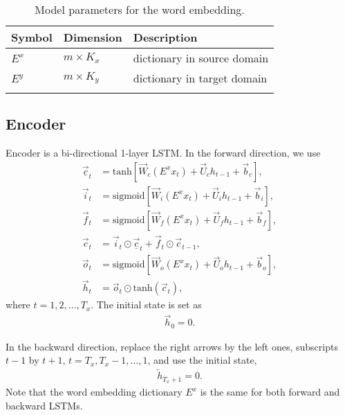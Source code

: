 \documentclass{article}
\begin{document}
\begin{table}[!htb]
\centering
\begin{tabular}{lll}
\toprule
Symbol & Dimension & Description \\
\midrule
$E^x$ & $m \times K_x$ & dictionary in source domain \\
$E^y$ & $m \times K_y$ & dictionary in target domain \\
\bottomrule \\
\end{tabular}
\caption{Model parameters for the word embedding.}
\label{tab:IOModel}
\end{table}




\subsection{Encoder}

	Encoder is a bi-directional 1-layer LSTM. In the forward direction, we use
		\begin{align}
			\overrightarrow{\underline{c}}_t &= \textrm{tanh}\left[ \overrightarrow{W}_c (E^x x_t) + \overrightarrow{U}_c h_{t-1} + \overrightarrow{b}_c \right], \\
			\overrightarrow{i}_t &= \textrm{sigmoid}\left[ \overrightarrow{W}_i (E^x x_t) + \overrightarrow{U}_i h_{t-1} + \overrightarrow{b}_i \right], \\
			\overrightarrow{f}_t &= \textrm{sigmoid}\left[ \overrightarrow{W}_f (E^x x_t) + \overrightarrow{U}_f h_{t-1} + \overrightarrow{b}_f \right], \\
			\overrightarrow{c}_t &= \overrightarrow{i}_t \odot \overrightarrow{\underline{c}}_t + \overrightarrow{f}_t \odot \overrightarrow{c}_{t-1}, \\
			\overrightarrow{o}_t &= \textrm{sigmoid}\left[ \overrightarrow{W}_o (E^x x_t) + \overrightarrow{U}_o h_{t-1} + \overrightarrow{b}_o \right], \\
			\overrightarrow{h}_t &= \overrightarrow{o}_t \odot \textrm{tanh}(\overrightarrow{c}_t),
		\end{align}
		where $t = 1, 2, \dots, T_x$. The initial state is set as
		\begin{align}
			\overrightarrow{h}_0 = 0.
		\end{align}
	
	In the backward direction, replace the right arrows by the left ones, subscripts $t - 1$ by $t + 1$, $t = T_x, T_x - 1, \dots, 1$, and use the initial state,
		\begin{align}
			\overleftarrow{h}_{T_x + 1} = 0.
		\end{align}
		Note that the word embedding dictionary $E^x$ is the same for both forward and backward LSTMs.
	
\end{document}
